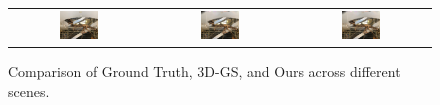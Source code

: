 \begin{figure}[h]
\begin{tabular}{ccc}
            \includegraphics[width=0.3\textwidth]{../o-3dgs/eval/trex/test/ours_30000/gt/00000.png} &
            \includegraphics[width=0.3\textwidth]{../o-3dgs/eval/trex/test/ours_30000/renders/00000.png} & 
            \includegraphics[width=0.3\textwidth]{../o-3dgs/eval/trex/test/ours_30000/renders/00000.png} \\
    \end{tabular}
    \caption{Comparison of Ground Truth, 3D-GS, and Ours across different scenes.}
    \label{fig:comparison}
\end{figure}